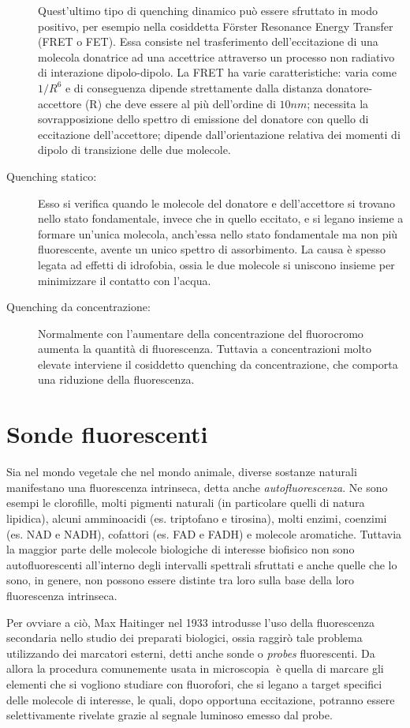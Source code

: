 \begin{description}
Quest'ultimo tipo di quenching dinamico può essere sfruttato in modo positivo, per esempio nella cosiddetta F\"{o}rster Resonance Energy Transfer (FRET o FET). 
Essa consiste nel trasferimento dell'eccitazione di una molecola donatrice ad una accettrice attraverso un processo non radiativo di interazione dipolo-dipolo.
La FRET ha varie caratteristiche: varia come $1/R^6$ e di conseguenza dipende strettamente dalla distanza donatore-accettore (R) che deve essere al più dell'ordine di $10 nm$; necessita la sovrapposizione dello spettro di emissione del donatore con quello di eccitazione dell'accettore; dipende dall'orientazione relativa dei momenti di dipolo di transizione delle due molecole.
\item [Quenching statico:]
Esso si verifica quando le molecole del donatore e dell'accettore si trovano nello stato fondamentale, invece che in quello eccitato, e si legano insieme a formare un'unica molecola, anch'essa nello stato fondamentale ma non più fluorescente, avente un unico spettro di assorbimento. 
La causa è spesso legata ad effetti di idrofobia, ossia le due molecole si uniscono insieme per minimizzare il contatto con l'acqua.
\item [Quenching da concentrazione:]
Normalmente con l'aumentare della concentrazione del fluorocromo aumenta la quantità di fluorescenza. 
Tuttavia a concentrazioni molto elevate interviene il cosiddetto quenching da concentrazione, che comporta una riduzione della fluorescenza.
\end{description} 


\section{Sonde fluorescenti}

Sia nel mondo vegetale che nel mondo animale, diverse sostanze naturali manifestano una fluorescenza intrinseca, detta anche \textit{autofluorescenza}.
Ne sono esempi le clorofille, molti pigmenti naturali (in particolare quelli di natura lipidica), alcuni amminoacidi (es. triptofano e tirosina), molti enzimi, coenzimi (es. NAD e NADH), cofattori (es. FAD e FADH) e molecole aromatiche. 
Tuttavia la maggior parte delle molecole biologiche di interesse biofisico non sono autofluorescenti all'interno degli intervalli spettrali sfruttati e anche quelle che lo sono, in genere, non possono essere distinte tra loro sulla base della loro fluorescenza intrinseca.

Per ovviare a ciò, Max Haitinger nel 1933 introdusse l'uso della fluorescenza secondaria nello studio dei preparati biologici, ossia raggirò tale problema utilizzando dei marcatori esterni, detti anche sonde o \textit{probes} fluorescenti. 
Da allora la procedura comunemente usata in microscopia è quella di marcare gli elementi che si vogliono studiare con fluorofori, che si legano a target specifici delle molecole di interesse, le quali, dopo opportuna eccitazione, potranno essere selettivamente rivelate grazie al segnale luminoso emesso dal probe. 

